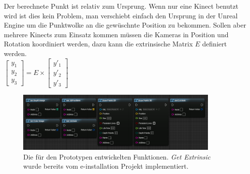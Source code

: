 \documentclass[a4paper]{IEEEtran}
\begin{document}
	Der berechnete Punkt ist relativ zum Ursprung. 
	Wenn nur eine Kinect benutzt wird ist dies kein Problem, man verschiebt einfach den Ursprung in der Unreal Engine um die Punktwolke an die gewüschnte Position zu bekommen. 
	Sollen aber mehrere Kinects zum Einsatz kommen müssen die Kameras in Position und Rotation koordiniert werden, dazu kann die extrinsische Matrix $E$ definiert werden. \\[1cm]

$\begin{bmatrix}
y_1 \\
y_2 \\
y_3
\end{bmatrix}
= E
\times
\begin{bmatrix}
y'_1 \\
y'_2 \\
y'_3
\end{bmatrix}$\\[1cm]

	\begin{figure}[t]
    	\centering
		\includegraphics[width=0.9\textwidth]{img/AllFunctionsBP}
	    \caption{Die für den Prototypen entwickelten Funktionen. {\textit{Get Extrinsic}} wurde bereits vom e-installation Projekt implementiert.}
    	\label{AllFunctionsBP}
	\end{figure}
\end{document}
